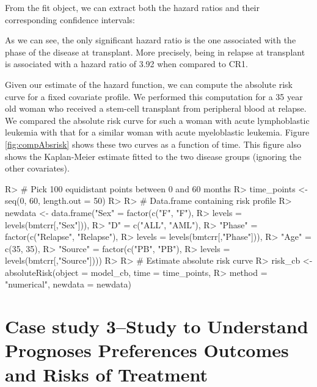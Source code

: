 \documentclass[
]{jss}
\begin{document}
From the fit object, we can extract both the hazard ratios and their
corresponding confidence intervals:

As we can see, the only significant hazard ratio is the one associated
with the phase of the disease at transplant. More precisely, being in
relapse at transplant is associated with a hazard ratio of 3.92 when
compared to CR1.

Given our estimate of the hazard function, we can compute the absolute
risk curve for a fixed covariate profile. We performed this computation
for a 35 year old woman who received a stem-cell transplant from
peripheral blood at relapse. We compared the absolute risk curve for
such a woman with acute lymphoblastic leukemia with that for a similar
woman with acute myeloblastic leukemia. Figure \ref{fig:compAbsrisk}
shows these two curves as a function of time. This figure also shows the
Kaplan-Meier estimate fitted to the two disease groups (ignoring the
other covariates).

\begin{CodeChunk}

\begin{CodeInput}
R> # Pick 100 equidistant points between 0 and 60 months
R> time_points <- seq(0, 60, length.out = 50)
R> 
R> # Data.frame containing risk profile
R> newdata <- data.frame("Sex" = factor(c("F", "F"), 
R>                                      levels = levels(bmtcrr[,"Sex"])),
R>                       "D" = c("ALL", "AML"),
R>                       "Phase" = factor(c("Relapse", "Relapse"), 
R>                                        levels = levels(bmtcrr[,"Phase"])),
R>                       "Age" = c(35, 35),
R>                       "Source" = factor(c("PB", "PB"), 
R>                                         levels = levels(bmtcrr[,"Source"])))
R> 
R> # Estimate absolute risk curve
R> risk_cb <- absoluteRisk(object = model_cb, time = time_points,
R>                         method = "numerical", newdata = newdata)
\end{CodeInput}
\end{CodeChunk}

\hypertarget{case-study-3study-to-understand-prognoses-preferences-outcomes-and-risks-of-treatment}{%
\section{Case study 3--Study to Understand Prognoses Preferences
Outcomes and Risks of
Treatment}\label{case-study-3study-to-understand-prognoses-preferences-outcomes-and-risks-of-treatment}}
\end{document}
